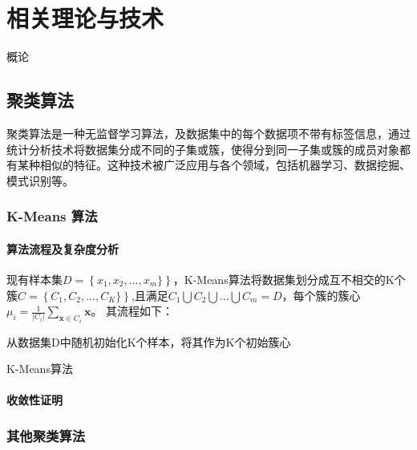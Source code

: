 \chapter{相关理论与技术}
概论

\section{聚类算法}
聚类算法是一种无监督学习算法，及数据集中的每个数据项不带有标签信息，通过统计分析技术将数据集分成不同的子集或簇，使得分到同一子集或簇的成员对象都有某种相似的特征。这种技术被广泛应用与各个领域，包括机器学习、数据挖掘、模式识别等。

\subsection{K-Means 算法}

\subsubsection{算法流程及复杂度分析}
现有样本集$D=\left\{x_1,x_2,...,x_m\}\right\}$，K-Means算法将数据集划分成互不相交的K个簇$C=\left\{C_1,C_2,...,C_K\}\right\}$,且满足$C_1\bigcup{C_2\bigcup{...\bigcup{C_m=D}}}$，每个簇的簇心$\mu _i=\frac{1}{|C_i|}\sum_{\mathbf{x}\in C_i}{\mathbf{x}}$。
其流程如下：
\begin{algorithm}[H]
	 从数据集D中随机初始化K个样本，将其作为K个初始簇心\;
	 \caption{K-Means算法}
\end{algorithm}

\subsubsection{收敛性证明}

\subsection{其他聚类算法}

